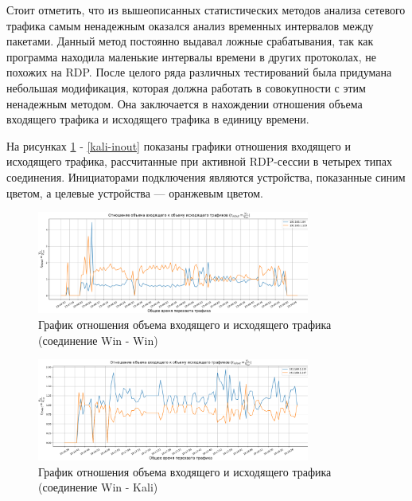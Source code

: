 \documentclass[bachelor, och, coursework]{SCWorks}
\begin{document}
Стоит отметить, что из вышеописанных статистических методов анализа сетевого трафика самым ненадежным оказался анализ временных интервалов между пакетами.
Данный метод постоянно выдавал ложные срабатывания, так как программа находила маленькие интервалы времени в других протоколах, не похожих на RDP. 
После целого ряда различных тестирований была придумана небольшая модификация, которая должна работать в совокупности с этим ненадежным методом.
Она заключается в нахождении отношения объема входящего трафика и исходящего трафика в единицу времени. 

На рисунках \ref{win-inout} - \ref{kali-inout} показаны графики отношения входящего и исходящего трафика, рассчитанные
при активной RDP-сессии в четырех типах соединения. Инициаторами подключения являются устройства, показанные синим цветом, 
а целевые устройства --- оранжевым цветом.


\begin{figure}[H]
  \centering
  \includegraphics[width=0.8\textwidth]{photo/inout-win.png}
  \caption{График отношения объема входящего и исходящего трафика (соединение Win - Win)}
  \label{win-inout}
\end{figure}


\begin{figure}[H]
  \centering
  \includegraphics[width=0.8\textwidth]{photo/inout-winkal.png}
  \caption{График отношения объема входящего и исходящего трафика (соединение Win - Kali)}
  \label{winkal-inout}
\end{figure}

\end{document}
